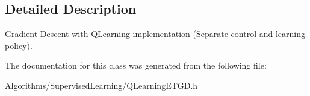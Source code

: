 \subsection{Detailed Description}
Gradient Descent with \hyperlink{classAI_1_1Algorithm_1_1QLearning}{Q\+Learning} implementation (Separate control and learning policy). 

The documentation for this class was generated from the following file\+:\begin{DoxyCompactItemize}
\item 
Algorithms/\+Supervised\+Learning/Q\+Learning\+E\+T\+G\+D.\+h\end{DoxyCompactItemize}

